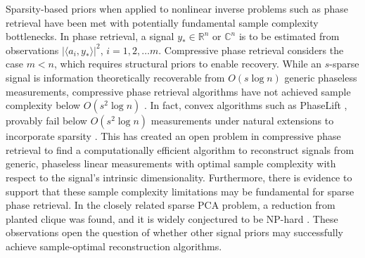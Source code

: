 \documentclass[11pt]{article}
\newcommand{\R}{\mathbb{R}}
\newcommand{\C}{\mathbb{C}}
\theoremstyle{remark}
\begin{document}
Sparsity-based priors when applied to nonlinear inverse problems such as phase retrieval have been met with potentially fundamental sample complexity bottlenecks. In phase
retrieval, a signal $y_* \in \R^n$ or $\C^n$ is to be estimated from observations $|\langle a_i,y_*\rangle|^2$, $i = 1,2,\dots m$. Compressive phase retrieval considers the case $m<n$, which requires structural priors to enable recovery. While an $s$-sparse signal is information theoretically recoverable from $O(s \log n)$ generic phaseless measurements, compressive phase retrieval  algorithms have not achieved sample complexity below $O(s^2 \log n)$ \cite{SparsePRoverview}. In fact, convex algorithms such as PhaseLift \cite{CandStrohVoron2013,CandLi2014}, 
provably fail below $O(s^2 \log n)$ measurements under natural extensions to incorporate sparsity \cite{Voroninski2013, Oymaketal15}. This has created an open problem in compressive phase retrieval to find a computationally efficient algorithm to reconstruct signals from generic, phaseless linear measurements with optimal sample complexity with respect to the signal's intrinsic dimensionality. Furthermore, there is evidence to support that these sample complexity limitations may be fundamental for sparse phase retrieval. In the closely related sparse PCA problem, a reduction from planted clique was found, and it is widely conjectured to be NP-hard \cite{BerthetRigollet13, SOS_planted_clique}.  These observations open the question of whether other signal priors may successfully achieve sample-optimal reconstruction algorithms.
\end{document}
